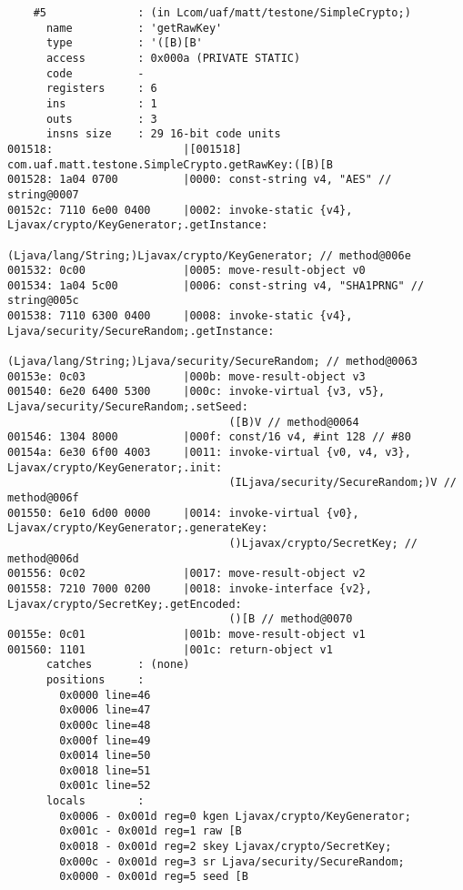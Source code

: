 \begin{lstlisting}
    #5              : (in Lcom/uaf/matt/testone/SimpleCrypto;)
      name          : 'getRawKey'
      type          : '([B)[B'
      access        : 0x000a (PRIVATE STATIC)
      code          -
      registers     : 6
      ins           : 1
      outs          : 3
      insns size    : 29 16-bit code units
001518:                    |[001518] com.uaf.matt.testone.SimpleCrypto.getRawKey:([B)[B
001528: 1a04 0700          |0000: const-string v4, "AES" // string@0007
00152c: 7110 6e00 0400     |0002: invoke-static {v4}, Ljavax/crypto/KeyGenerator;.getInstance:
                                  (Ljava/lang/String;)Ljavax/crypto/KeyGenerator; // method@006e
001532: 0c00               |0005: move-result-object v0
001534: 1a04 5c00          |0006: const-string v4, "SHA1PRNG" // string@005c
001538: 7110 6300 0400     |0008: invoke-static {v4}, Ljava/security/SecureRandom;.getInstance:
                                  (Ljava/lang/String;)Ljava/security/SecureRandom; // method@0063
00153e: 0c03               |000b: move-result-object v3
001540: 6e20 6400 5300     |000c: invoke-virtual {v3, v5}, Ljava/security/SecureRandom;.setSeed:
                                  ([B)V // method@0064
001546: 1304 8000          |000f: const/16 v4, #int 128 // #80
00154a: 6e30 6f00 4003     |0011: invoke-virtual {v0, v4, v3}, Ljavax/crypto/KeyGenerator;.init:
                                  (ILjava/security/SecureRandom;)V // method@006f
001550: 6e10 6d00 0000     |0014: invoke-virtual {v0}, Ljavax/crypto/KeyGenerator;.generateKey:
                                  ()Ljavax/crypto/SecretKey; // method@006d
001556: 0c02               |0017: move-result-object v2
001558: 7210 7000 0200     |0018: invoke-interface {v2}, Ljavax/crypto/SecretKey;.getEncoded:
                                  ()[B // method@0070
00155e: 0c01               |001b: move-result-object v1
001560: 1101               |001c: return-object v1
      catches       : (none)
      positions     :
        0x0000 line=46
        0x0006 line=47
        0x000c line=48
        0x000f line=49
        0x0014 line=50
        0x0018 line=51
        0x001c line=52
      locals        :
        0x0006 - 0x001d reg=0 kgen Ljavax/crypto/KeyGenerator;
        0x001c - 0x001d reg=1 raw [B
        0x0018 - 0x001d reg=2 skey Ljavax/crypto/SecretKey;
        0x000c - 0x001d reg=3 sr Ljava/security/SecureRandom;
        0x0000 - 0x001d reg=5 seed [B


\end{lstlisting}
